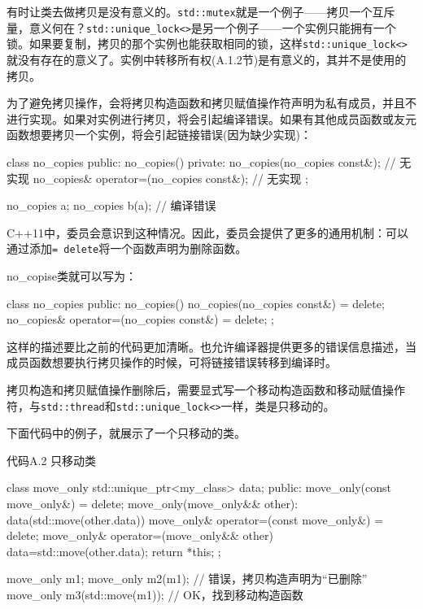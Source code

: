 
有时让类去做拷贝是没有意义的。\texttt{std::mutex}就是一个例子——拷贝一个互斥量，意义何在？\texttt{std::unique\_lock<>}是另一个例子——一个实例只能拥有一个锁。如果要复制，拷贝的那个实例也能获取相同的锁，这样\texttt{std::unique\_lock<>}就没有存在的意义了。实例中转移所有权(A.1.2节)是有意义的，其并不是使用的拷贝。

为了避免拷贝操作，会将拷贝构造函数和拷贝赋值操作符声明为私有成员，并且不进行实现。如果对实例进行拷贝，将会引起编译错误。如果有其他成员函数或友元函数想要拷贝一个实例，将会引起链接错误(因为缺少实现)：

\begin{cpp}
class no_copies
{
public:
  no_copies(){}
private:
  no_copies(no_copies const&);  // 无实现
  no_copies& operator=(no_copies const&);  // 无实现
};

no_copies a;
no_copies b(a);  // 编译错误
\end{cpp}

C++11中，委员会意识到这种情况。因此，委员会提供了更多的通用机制：可以通过添加\texttt{= delete}将一个函数声明为删除函数。

no\_copise类就可以写为：

\begin{cpp}
class no_copies
{
public:
  no_copies(){}
  no_copies(no_copies const&) = delete;
  no_copies& operator=(no_copies const&) = delete;
};
\end{cpp}

这样的描述要比之前的代码更加清晰。也允许编译器提供更多的错误信息描述，当成员函数想要执行拷贝操作的时候，可将链接错误转移到编译时。

拷贝构造和拷贝赋值操作删除后，需要显式写一个移动构造函数和移动赋值操作符，与\texttt{std::thread}和\texttt{std::unique\_lock<>}一样，类是只移动的。

下面代码中的例子，就展示了一个只移动的类。

代码A.2 只移动类

\begin{cpp}
class move_only
{
  std::unique_ptr<my_class> data;
public:
  move_only(const move_only&) = delete;
  move_only(move_only&& other):
    data(std::move(other.data))
  {}
  move_only& operator=(const move_only&) = delete;
  move_only& operator=(move_only&& other)
  {
    data=std::move(other.data);
    return *this;
  }
};

move_only m1;
move_only m2(m1);  // 错误，拷贝构造声明为“已删除”
move_only m3(std::move(m1));  // OK，找到移动构造函数
\end{cpp}

